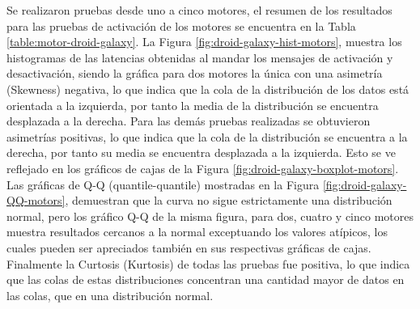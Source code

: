 Se realizaron pruebas desde uno a cinco motores, el resumen de los resultados para las pruebas de activación de los motores se encuentra en la Tabla \ref{table:motor-droid-galaxy}. La Figura \ref{fig:droid-galaxy-hist-motors}, muestra los histogramas de las latencias obtenidas al mandar los mensajes de activación y desactivación, siendo la gráfica para dos motores la única con una asimetría (Skewness) negativa, lo que indica que la cola de la distribución de los datos está orientada a la izquierda, por tanto la media de la distribución se encuentra desplazada a la derecha. Para las demás pruebas realizadas se obtuvieron asimetrías positivas, lo que indica que la cola de la distribución se encuentra a la derecha, por tanto su media se encuentra desplazada a la izquierda. Esto se ve reflejado en los gráficos de cajas de la Figura \ref{fig:droid-galaxy-boxplot-motors}. Las gráficas de Q-Q (quantile-quantile) mostradas en la Figura \ref{fig:droid-galaxy-QQ-motors}, demuestran que la curva no sigue estrictamente una distribución normal, pero los gráfico Q-Q de la misma figura, para dos, cuatro y cinco motores muestra resultados cercanos a la normal exceptuando los valores atípicos, los cuales pueden ser apreciados también en sus respectivas gráficas de cajas. Finalmente la Curtosis (Kurtosis) de todas las pruebas fue positiva, lo que indica que las colas de estas distribuciones concentran una cantidad mayor de datos en las colas, que en una distribución normal.



